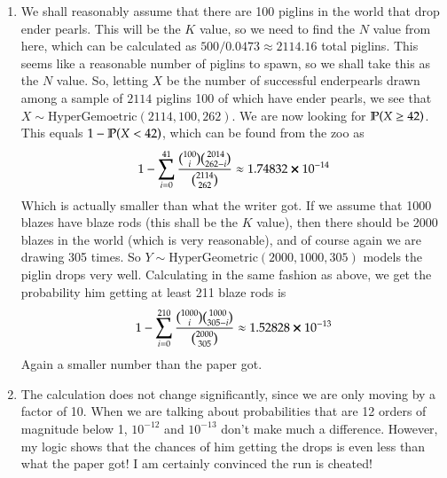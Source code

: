 \documentclass[12pt]{article}
\theoremstyle{definitionstyle}
\renewcommand{\P}{\mathbb{P}\qty}
\begin{document}
\begin{enumerate}[leftmargin=\labelsep]
\begin{enumerate}
			\item We shall reasonably assume that there are 100 piglins in the world that drop ender pearls. This will be the $K$ value, so we need to find the $N$ value from here, which can be calculated as $500 / 0.0473 \approx 2114.16$ total piglins. This seems like a reasonable number of piglins to spawn, so we shall take this as the $N$ value. So, letting $X$ be the number of successful enderpearls drawn among a sample of $2114$ piglins 100 of which have ender pearls, we see that $X \sim \mathrm{HyperGemoetric}(2114, 100, 262)$. We are now looking for $\P(X \geq 42)$. This equals $1 -\P(X < 42)$, which can be found from the zoo as 
			\begin{align*}
				1 - \sum_{i=0}^{41} \frac{{100 \choose i}{2014 \choose 262-i}}{{2114 \choose 262}} \approx 1.74832 \cross 10^{-14}
			\end{align*}
			Which is actually smaller than what the writer got. If we assume that 1000 blazes have blaze rods (this shall be the $K$ value), then there should be 2000 blazes in the world (which is very reasonable), and of course again we are drawing 305 times. So $Y \sim \mathrm{HyperGeometric}(2000, 1000, 305)$ models the piglin drops very well. Calculating in the same fashion as above, we get the probability him getting at least 211 blaze rods is
			\begin{align*}
				1 - \sum_{i=0}^{210} \frac{{1000 \choose i}{1000 \choose 305-i}}{{2000 \choose 305}} \approx 1.52828 \cross 10^{-13}
			\end{align*}
			Again a smaller number than the paper got.
			
			\item The calculation does not change significantly, since we are only moving by a factor of 10. When we are talking about probabilities that are 12 orders of magnitude below 1, $10^{-12}$ and $10^{-13}$ don't make much a difference. However, my logic shows that the chances of him getting the drops is even less than what the paper got! I am certainly convinced the run is cheated!
		\end{enumerate}
	\end{enumerate}
\end{document}
